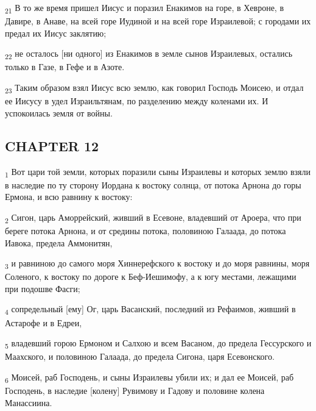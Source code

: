\begin{tcolorbox}
\textsubscript{21} В то же время пришел Иисус и поразил Енакимов на горе, в Хевроне, в Давире, в Анаве, на всей горе Иудиной и на всей горе Израилевой; с городами их предал их Иисус заклятию;
\end{tcolorbox}
\begin{tcolorbox}
\textsubscript{22} не осталось [ни одного] из Енакимов в земле сынов Израилевых, остались только в Газе, в Гефе и в Азоте.
\end{tcolorbox}
\begin{tcolorbox}
\textsubscript{23} Таким образом взял Иисус всю землю, как говорил Господь Моисею, и отдал ее Иисусу в удел Израильтянам, по разделению между коленами их. И успокоилась земля от войны.
\end{tcolorbox}
\subsection{CHAPTER 12}
\begin{tcolorbox}
\textsubscript{1} Вот цари той земли, которых поразили сыны Израилевы и которых землю взяли в наследие по ту сторону Иордана к востоку солнца, от потока Арнона до горы Ермона, и всю равнину к востоку:
\end{tcolorbox}
\begin{tcolorbox}
\textsubscript{2} Сигон, царь Аморрейский, живший в Есевоне, владевший от Ароера, что при береге потока Арнона, и от средины потока, половиною Галаада, до потока Иавока, предела Аммонитян,
\end{tcolorbox}
\begin{tcolorbox}
\textsubscript{3} и равниною до самого моря Хиннерефского к востоку и до моря равнины, моря Соленого, к востоку по дороге к Беф-Иешимофу, а к югу местами, лежащими при подошве Фасги;
\end{tcolorbox}
\begin{tcolorbox}
\textsubscript{4} сопредельный [ему] Ог, царь Васанский, последний из Рефаимов, живший в Астарофе и в Едреи,
\end{tcolorbox}
\begin{tcolorbox}
\textsubscript{5} владевший горою Ермоном и Салхою и всем Васаном, до предела Гессурского и Маахского, и половиною Галаада, до предела Сигона, царя Есевонского.
\end{tcolorbox}
\begin{tcolorbox}
\textsubscript{6} Моисей, раб Господень, и сыны Израилевы убили их; и дал ее Моисей, раб Господень, в наследие [колену] Рувимову и Гадову и половине колена Манассиина.
\end{tcolorbox}

